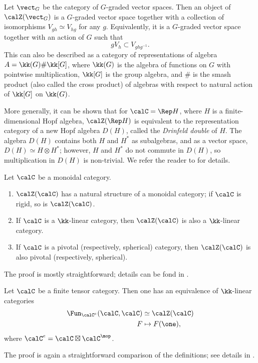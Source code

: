 \begin{example}\label{x:center-vectg}
  Let $\vect_G$ be the category of $G$-graded vector spaces. Then an object
  of $\calZ(\vect_G)$ is a $G$-graded vector space together with a collection
  of isomorphisms $V_{gh}\simeq V_{hg}$ for any $g$. Equivalently, it is a
  $G$-graded vector space together with an action of $G$ such that
  $$
   gV_h\subset V_{ghg^{-1}}.
  $$
  This can also be described as a category of representations of algebra
  $A=\kk(G)\# \kk[G]$, where $\kk(G)$ is the algebra of functions on $G$
  with pointwise multiplication, $\kk[G]$ is the group algebra, and $\#$ is
  the smash product (also called the cross product) of algebras with
  respect to natural action of $\kk[G]$ on $\kk(G)$.
\end{example}
More generally, it can be shown that for $\calC=\Rep H$, where $H$ is a
finite-dimensional Hopf algebra, $\calZ(\Rep H)$ is equivalent to the
representation category of a new Hopf algebra $D(H)$, called the \emph{Drinfeld
double} of $H$. The algebra $D(H)$ contains both $H$ and
$H^*$ as subalgebras, and as a vector space, $D(H)\simeq H\otimes H^*$; however,
$H$ and $H^*$ do not commute in $D(H)$, so multiplication in $D(H)$ is
non-trivial. We refer the reader to \cite[Section 7.14]{etingof-fusion} for
details.

\begin{lemma}\label{l:drinfeld-monoidal}
  Let $\calC$ be a monoidal category.
  \begin{enumerate}
    \item $\calZ(\calC)$ has a natural structure of a monoidal category; if
      $\calC$ is rigid, so is $\calZ(\calC)$.
    \item If $\calC$ is a $\kk$-linear category, then $\calZ(\calC)$ is also
      a $\kk$-linear category.
    \item If $\calC$ is a pivotal \textup{(}respectively, spherical\textup{)} category, then
      $\calZ(\calC)$ is also pivotal \textup{(}respectively, spherical\textup{)}.
  \end{enumerate}
\end{lemma}
The proof is mostly straightforward; details can be fond in
\cite[Section 7.13]{etingof-fusion}.

\begin{lemma}\label{l:dr-center-2}
  Let $\calC$ be a finite tensor category. Then one has an equivalence of
  $\kk$-linear categories
  \begin{align*}
    \Fun_{\calC^e}(\calC, \calC)&\simeq \calZ(\calC)\\
                              F&\mapsto F(\one),
  \end{align*}
  where $\calC^e=\calC\boxtimes\calC^{\mop}$.
\end{lemma}
The proof is again a straightforward comparison of the definitions; see details
in  \cite[Proposition 7.13.8]{etingof-fusion}.


